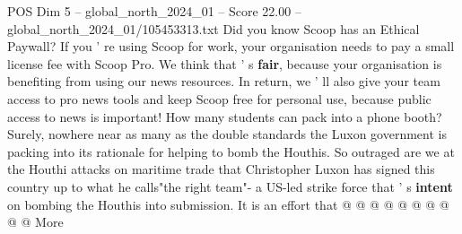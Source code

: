 \begin{textsample}{POS Dim 5 – global\_north\_2024\_01 – Score 22.00 – global\_north\_2024\_01/105453313.txt}
Did you know Scoop has an Ethical Paywall?
If you ' re using Scoop for work, your organisation needs to pay a small license fee with Scoop Pro.
We think that ' s \textbf{fair}, because your organisation is benefiting from using our news resources.
In return, we ' ll also give your team access to pro news tools and keep Scoop free for personal use, because public access to news is important!
How many students can pack into a phone booth?
Surely, nowhere near as many as the double standards the Luxon government is packing into its rationale for helping to bomb the Houthis.
So outraged are we at the Houthi attacks on maritime trade that Christopher Luxon has signed this country up to what he calls"the right team"- a US-led strike force that ' s \textbf{intent} on bombing the Houthis into submission.
It is an effort that @ @ @ @ @ @ @ @ @ @ More

\end{textsample}
